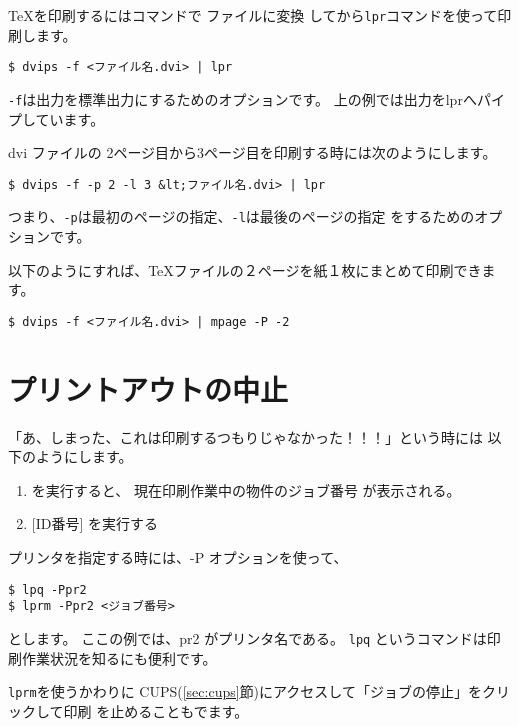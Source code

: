 \documentclass{jreport}
\begin{document}
\TeX を印刷するにはコマンドで ファイルに変換
してから\verb|lpr|コマンドを使って印刷します。
\begin{screen}
\begin{verbatim}
$ dvips -f <ファイル名.dvi> | lpr
\end{verbatim}
\end{screen}
\verb|-f|は出力を標準出力にするためのオプションです。
上の例では出力をlprへパイプしています。

dvi ファイルの 2ページ目から3ページ目を印刷する時には次のようにします。
\begin{screen}
\begin{verbatim}
$ dvips -f -p 2 -l 3 &lt;ファイル名.dvi> | lpr
\end{verbatim}
\end{screen}

つまり、\verb|-p|は最初のページの指定、\verb|-l|は最後のページの指定
をするためのオプションです。

以下のようにすれば、TeXファイルの２ページを紙１枚にまとめて印刷できま
す。
\begin{screen}
\begin{verbatim}
$ dvips -f <ファイル名.dvi> | mpage -P -2  
\end{verbatim}
\end{screen}

\section{プリントアウトの中止}

「あ、しまった、これは印刷するつもりじゃなかった！！！」という時には
以下のようにします。
\begin{enumerate}
\item {} を実行すると、 現在印刷作業中の物件のジョブ番号 が表示される。 
\item {} [ID番号] を実行する 
\end{enumerate}

プリンタを指定する時には、-P オプションを使って、
\begin{screen}
\begin{verbatim}
$ lpq -Ppr2
$ lprm -Ppr2 <ジョブ番号>
\end{verbatim}
\end{screen}
とします。
ここの例では、pr2 がプリンタ名である。
\verb|lpq| というコマンドは印刷作業状況を知るにも便利です。

\verb|lprm|を使うかわりに
CUPS(\ref{sec:cups}節)にアクセスして「ジョブの停止」をクリックして印刷
を止めることもでます。
\end{document}
